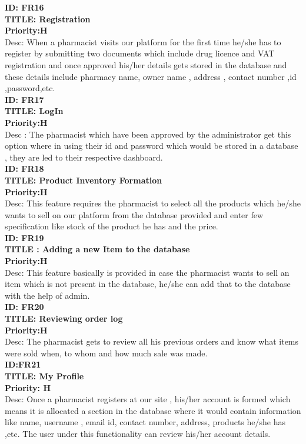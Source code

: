 \documentclass{scrreprt}
\begin{document}
\textbf{ID: FR16}   \\
\textbf{TITLE: Registration}  \\
\textbf{Priority:H}  \\
Desc: When a pharmacist visits our platform for the first time he/she has to register by submitting two documents which include drug licence and VAT registration and once approved his/her details gets stored in the database and these details include pharmacy name, owner name , address , contact number ,id ,password,etc.   \\

\textbf{ID: FR17}  \\
\textbf{TITLE: LogIn}  \\
\textbf{Priority:H}  \\
Desc : The pharmacist which have been approved by the administrator  get this option where in using their id and password which would be stored in a database , they are led to their respective dashboard.  \\

\textbf{ID: FR18}  \\
\textbf{TITLE: Product Inventory Formation}  \\
\textbf{Priority:H}   \\
Desc: This feature requires the pharmacist to select all the products which he/she wants to sell on our platform from the database provided and enter few specification like stock of the product he has and the price.   \\

\textbf{ID: FR19}  \\
\textbf{TITLE	: Adding a new Item to the database}  \\
\textbf{Priority:H}  \\
Desc: This feature basically is provided in case the pharmacist wants to sell an item which is not present in the database, he/she can add that to the database with the help of admin.  \\

\textbf{ID: FR20}  \\
\textbf{TITLE: Reviewing order log}   \\
\textbf{Priority:H}  \\
Desc: The pharmacist gets to review all his previous orders and know what items were sold when, to whom and how much sale was made.  \\

\textbf{ID:FR21}  \\
\textbf{TITLE: My Profile}   \\
\textbf{Priority: H}  \\
Desc: Once a pharmacist registers at our site , his/her account is formed which means it is allocated a section in the database where it would contain information like name, username , email id, contact number, address, products he/she has ,etc. The user under this functionality can review his/her account details.  \\
\end{document}
